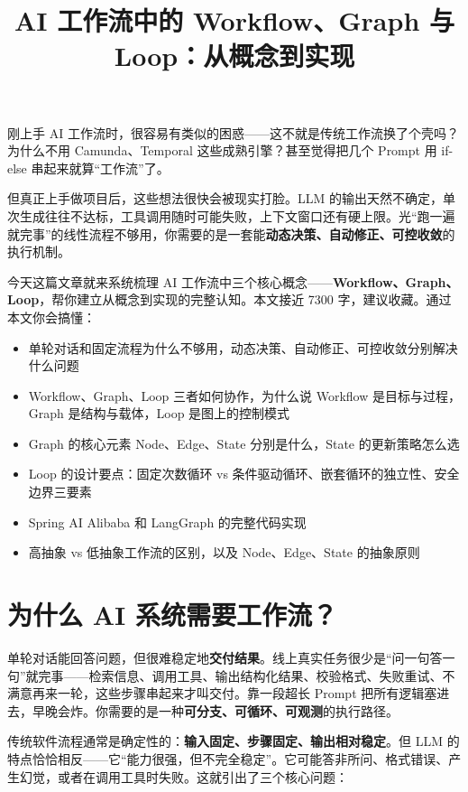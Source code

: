 \documentclass[10pt,a4paper]{ctexart}
\begin{document}
\title{AI 工作流中的 Workflow、Graph 与 Loop：从概念到实现}
\date{}
\maketitle

刚上手 AI 工作流时，很容易有类似的困惑——这不就是传统工作流换了个壳吗？为什么不用 Camunda、Temporal 这些成熟引擎？甚至觉得把几个 Prompt 用 if-else 串起来就算“工作流”了。



但真正上手做项目后，这些想法很快会被现实打脸。LLM 的输出天然不确定，单次生成往往不达标，工具调用随时可能失败，上下文窗口还有硬上限。光“跑一遍就完事”的线性流程不够用，你需要的是一套能\textbf{动态决策、自动修正、可控收敛}的执行机制。



今天这篇文章就来系统梳理 AI 工作流中三个核心概念——\textbf{Workflow、Graph、Loop}，帮你建立从概念到实现的完整认知。本文接近 7300 字，建议收藏。通过本文你会搞懂：


\begin{itemize}[itemsep=2pt, topsep=4pt]
  \item 单轮对话和固定流程为什么不够用，动态决策、自动修正、可控收敛分别解决什么问题
  \item Workflow、Graph、Loop 三者如何协作，为什么说 Workflow 是目标与过程，Graph 是结构与载体，Loop 是图上的控制模式
  \item Graph 的核心元素 Node、Edge、State 分别是什么，State 的更新策略怎么选
  \item Loop 的设计要点：固定次数循环 vs 条件驱动循环、嵌套循环的独立性、安全边界三要素
  \item Spring AI Alibaba 和 LangGraph 的完整代码实现
  \item 高抽象 vs 低抽象工作流的区别，以及 Node、Edge、State 的抽象原则
\end{itemize}


\section{为什么 AI 系统需要工作流？}


单轮对话能回答问题，但很难稳定地\textbf{交付结果}。线上真实任务很少是“问一句答一句”就完事——检索信息、调用工具、输出结构化结果、校验格式、失败重试、不满意再来一轮，这些步骤串起来才叫交付。靠一段超长 Prompt 把所有逻辑塞进去，早晚会炸。你需要的是一种\textbf{可分支、可循环、可观测}的执行路径。



传统软件流程通常是确定性的：\textbf{输入固定、步骤固定、输出相对稳定}。但 LLM 的特点恰恰相反——它“能力很强，但不完全稳定”。它可能答非所问、格式错误、产生幻觉，或者在调用工具时失败。这就引出了三个核心问题：
\end{document}
